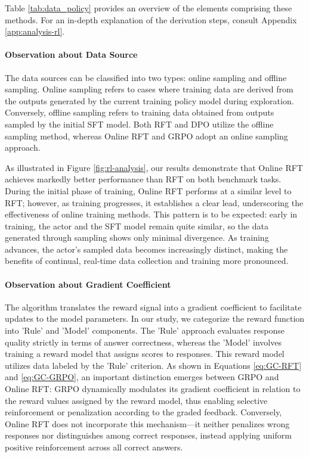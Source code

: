 \begin{itemize}[topsep=0pt]
\begin{itemize}[topsep=0pt]
Table \ref{tab:data_policy} provides an overview of the elements comprising these methods. For an in-depth explanation of the derivation steps, consult Appendix \ref{app:analysis-rl}.

\paragraph{Observation about Data Source} The data sources can be classified into two types: online sampling and offline sampling. Online sampling refers to cases where training data are derived from the outputs generated by the current training policy model during exploration. Conversely, offline sampling refers to training data obtained from outputs sampled by the initial SFT model. Both RFT and DPO utilize the offline sampling method, whereas Online RFT and GRPO adopt an online sampling approach.

As illustrated in Figure \ref{fig:rl-analysis}, our results demonstrate that Online RFT achieves markedly better performance than RFT on both benchmark tasks. During the initial phase of training, Online RFT performs at a similar level to RFT; however, as training progresses, it establishes a clear lead, underscoring the effectiveness of online training methods. This pattern is to be expected: early in training, the actor and the SFT model remain quite similar, so the data generated through sampling shows only minimal divergence. As training advances, the actor's sampled data becomes increasingly distinct, making the benefits of continual, real-time data collection and training more pronounced.

\paragraph{Observation about Gradient Coefficient} The algorithm translates the reward signal into a gradient coefficient to facilitate updates to the model parameters. In our study, we categorize the reward function into 'Rule' and 'Model' components. The 'Rule' approach evaluates response quality strictly in terms of answer correctness, whereas the 'Model' involves training a reward model that assigns scores to responses. This reward model utilizes data labeled by the 'Rule' criterion. As shown in Equations \ref{eq:GC-RFT} and \ref{eq:GC-GRPO}, an important distinction emerges between GRPO and Online RFT: GRPO dynamically modulates its gradient coefficient in relation to the reward values assigned by the reward model, thus enabling selective reinforcement or penalization according to the graded feedback. Conversely, Online RFT does not incorporate this mechanism—it neither penalizes wrong responses nor distinguishes among correct responses, instead applying uniform positive reinforcement across all correct answers.


\end{itemize}
\end{itemize}
